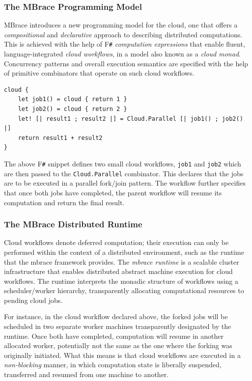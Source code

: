 \documentclass[9pt,a4paper]{article}
\newcommand{\mbrace}{mbrace}
\newcommand{\Mbrace}{MBrace}
\newcommand{\TitularMbrace}{MBrace}
\newcommand{\fsharp}{F\texttt \#}
\begin{document}
\subsubsection*{The \TitularMbrace{} Programming Model}

\Mbrace{} introduces a new programming model for the cloud, one that offers a 
\emph{compositional} and \emph{declarative} approach to describing distributed 
computations. This is achieved with the help of \fsharp{} \emph{computation expressions} 
that enable fluent, language-integrated \emph{cloud workflows}, in a model also known
as a \emph{cloud monad}. Concurrency patterns and overall execution semantics are specified 
with the help of primitive combinators that operate on such cloud workflows.
%
\begin{lstlisting}
cloud {
	let job1() = cloud { return 1 }
	let job2() = cloud { return 2 }
	let! [| result1 ; result2 |] = Cloud.Parallel [| job1() ; job2() |]	
	return result1 + result2
}
\end{lstlisting}
The above \fsharp{} snippet defines two small cloud workflows, \texttt{job1} and
\texttt{job2} which are then passed to the \texttt{Cloud.Parallel}
combinator. This declares that the jobs are to be executed in a parallel
fork/join pattern. The workflow further specifies that once both jobs have
completed, the parent workflow will resume its computation and return the final
result.
%

\subsubsection*{The \TitularMbrace{} Distributed Runtime}

Cloud workflows denote deferred computation; their execution can only be performed within
the context of a distributed environment, such as the runtime that the \mbrace{}
framework provides. The \emph{\mbrace{} runtime} is a scalable cluster infrastructure that
enables distributed abstract machine execution for cloud workflows.
The runtime interprets the monadic structure of workflows using a scheduler/worker hierarchy, 
transparently allocating computational resources to pending cloud jobs.

For instance, in the cloud workflow declared above, the forked jobs will be
scheduled in two separate worker machines transparently designated by the
runtime. Once both have completed, computation will resume in another allocated
worker, potentially not the same as the one where the forking was originally
initiated. What this means is that cloud workflows are executed in a
\emph{non-blocking} manner, in which computation state is liberally suspended,
transferred and resumed from one machine to another.
\end{document}
